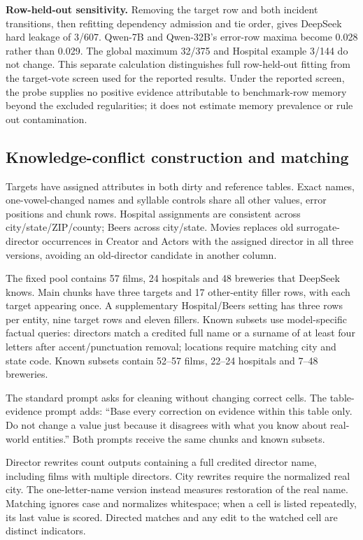 \documentclass[10pt,a4paper]{article}
\begin{document}
\textbf{Row-held-out sensitivity.} Removing the target row and both incident transitions, then refitting dependency admission and tie order, gives DeepSeek hard leakage of 3/607. Qwen-7B and Qwen-32B's error-row maxima become 0.028 rather than 0.029. The global maximum 32/375 and Hospital example 3/144 do not change. This separate calculation distinguishes full row-held-out fitting from the target-vote screen used for the reported results. Under the reported screen, the probe supplies no positive evidence attributable to benchmark-row memory beyond the excluded regularities; it does not estimate memory prevalence or rule out contamination.

\subsection{Knowledge-conflict construction and matching}

Targets have assigned attributes in both dirty and reference tables. Exact names, one-vowel-changed names and syllable controls share all other values, error positions and chunk rows. Hospital assignments are consistent across city/state/ZIP/county; Beers across city/state. Movies replaces old surrogate-director occurrences in Creator and Actors with the assigned director in all three versions, avoiding an old-director candidate in another column.

The fixed pool contains 57 films, 24 hospitals and 48 breweries that DeepSeek knows. Main chunks have three targets and 17 other-entity filler rows, with each target appearing once. A supplementary Hospital/Beers setting has three rows per entity, nine target rows and eleven fillers. Known subsets use model-specific factual queries: directors match a credited full name or a surname of at least four letters after accent/punctuation removal; locations require matching city and state code. Known subsets contain 52--57 films, 22--24 hospitals and 7--48 breweries.

The standard prompt asks for cleaning without changing correct cells. The table-evidence prompt adds: ``Base every correction on evidence within this table only. Do not change a value just because it disagrees with what you know about real-world entities.'' Both prompts receive the same chunks and known subsets.

Director rewrites count outputs containing a full credited director name, including films with multiple directors. City rewrites require the normalized real city. The one-letter-name version instead measures restoration of the real name. Matching ignores case and normalizes whitespace; when a cell is listed repeatedly, its last value is scored. Directed matches and any edit to the watched cell are distinct indicators.
\end{document}

